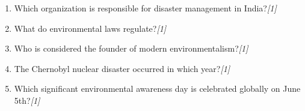 \documentclass[11pt,a4paper]{article}
\newcommand{\pts}[1]{\hfill   \textit{[#1]}}
\begin{document}
\begin{enumerate}[label=   \textbf{Question \arabic*.}]
    \medskip

    \item Which organization is responsible for disaster management in India?\pts{1}
    

    \medskip

    \item What do environmental laws regulate?\pts{1}
    

    \medskip

    \item Who is considered the founder of modern environmentalism?\pts{1}
    

    \medskip

    \item The Chernobyl nuclear disaster occurred in which year?\pts{1}
    

    \medskip

    \item Which significant environmental awareness day is celebrated globally on June 5th?\pts{1}
    

\end{enumerate}
\end{document}
